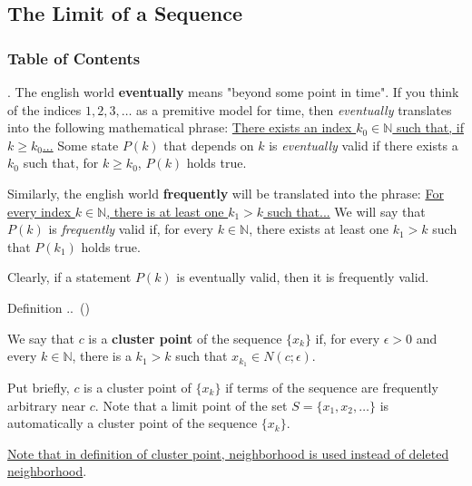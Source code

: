 \documentclass[8pt]{beamer}
\newcounter{defn}
\newcounter{ex}
\renewcommand{\thedefn}{\thesection.\thesubsection.\arabic{defn}}
\renewenvironment{definition}[1][]{%
    \refstepcounter{defn}%
    \begin{block}{Definition \thedefn\if\relax\detokenize{#1}\relax\else\ (#1)\fi}%
}{%
    \end{block}%
}
\newcommand{\mbb}[1]{\mathbb{#1}}
\newcommand{\tb}[1]{\textbf{#1}}
\newcommand{\ti}[1]{\textit{#1}}
\begin{document}
\subsection{The Limit of a Sequence}

\begingroup
    \begin{frame}
        \frametitle{Table of Contents}
        \tableofcontents[currentsubsection]
    \end{frame}
\endgroup

\begin{frame}{.}
    The english world \tb{eventually} means "beyond some point in time".
    If you think of the indices $1,2,3,\dots$ as a premitive model for time, then \ti{eventually} translates into the following mathematical phrase: \underline{There exists an index $k_0 \in \mbb{N}$ such that, if $k \geq k_0$...}
    Some state $P(k)$ that depends on $k$ is \ti{eventually} valid if there exists a $k_0$ such that, for $k \geq k_0$, $P(k)$ holds true.

    \smallskip
    Similarly, the english world \tb{frequently} will be translated into the phrase: \underline{For every index $k\in\mbb{N}$, there is at least one $k_1 > k$ such that...}
    We will say that $P(k)$ is \ti{frequently} valid if, for every $k \in \mbb{N}$, there exists at least one $k_1 > k$ such that $P(k_1)$ holds true.

    \smallskip
    Clearly, if a statement $P(k)$ is eventually valid, then it is frequently valid.

    \begin{definition}
        We say that $c$ is a \tb{cluster point} of the sequence $\{x_k\}$ if, for every $\epsilon> 0$ and every $k \in \mbb{N}$, there is a $k_1 > k$ such that $x_{k_1} \in N(c; \epsilon)$.
    \end{definition}

    Put briefly, $c$ is a cluster point of $\{x_k\}$ if terms of the sequence are frequently arbitrary near $c$.
    Note that a limit point of the set $S = \{x_1, x_2, \dots\}$ is automatically a cluster point of the sequence $\{x_k\}$.

    \underline{Note that in definition of cluster point, neighborhood is used instead of deleted neighborhood}.
\end{frame}
\end{document}
